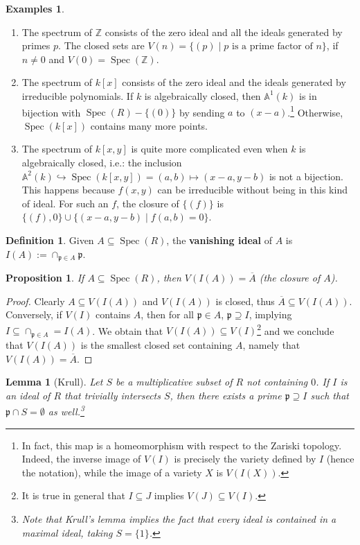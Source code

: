 \documentclass{tufte-handout} %
\newtheorem{prop}[thm]{Proposition}
\newtheorem{lem}[thm]{Lemma}
\theoremstyle{definition}
\newtheorem{defn}[thm]{Definition}
\newtheorem{exmps}[thm]{Examples}
\theoremstyle{remark}
\newcommand{\Z}{\mathbb{Z}}
\newcommand{\bA}{\mathbb{A}}
\newcommand{\lp}{{\mathfrak{p}}}
\DeclareMathOperator{\spec}{Spec}
\begin{document}
\begin{exmps}
	\begin{enumerate}
		\item The spectrum of $\Z$ consists of the zero ideal and all the ideals generated by primes $p$. The closed sets are $V(n) = \{(p) \mid p \text{ is a prime factor of } n\}$, if $n\neq 0$ and $V(0) = \spec(\Z)$.
		\item The spectrum of $k[x]$ consists of the zero ideal and the ideals generated by irreducible polynomials. If $k$ is algebraically closed, then $\bA^1(k)$ is in bijection with $\spec(R) - \{(0)\}$ by sending $a$ to $(x-a)$.\footnote{In fact, this map is a homeomorphism with respect to the Zariski topology. Indeed, the inverse image of $V(I)$ is precisely the variety defined by $I$ (hence the notation), while the image of a variety $X$ is $V(I(X))$.} Otherwise, $\spec(k[x])$ contains many more points.
		\item The spectrum of $k[x,y]$ is quite more complicated even when $k$ is algebraically closed, i.e.: the inclusion $\bA^2(k) \hookrightarrow \spec(k[x,y])= (a,b) \mapsto (x-a, y-b)$ is not a bijection. This happens because $f(x,y)$ can be irreducible without being in this kind of ideal. For such an $f$, the closure of $\{(f)\}$ is $\{(f), 0\} \cup \{(x-a,y-b) \mid f(a,b) = 0\}$.
	\end{enumerate}
\end{exmps}
\begin{defn}
	Given $A \subseteq \spec(R)$, the \textbf{vanishing ideal} of $A$ is $I(A) := \cap_{\lp \in A}\lp$.
\end{defn}
\begin{prop}
	If $A \subseteq \spec(R)$, then $V(I(A)) = \overline{A}$ (the closure of $A$).
\end{prop}
\begin{proof}
	Clearly $A \subseteq V(I(A))$ and $V(I(A))$ is closed, thus $\overline{A} \subseteq V(I(A))$. Conversely, if $V(I)$ contains $A$, then for all $\lp \in A$, $\lp \supseteq I$, implying $I \subseteq \cap_{\lp \in A} = I(A)$. We obtain that $V(I(A)) \subseteq V(I)$\footnote{It is true in general that $I \subseteq J$ implies $V(J) \subseteq V(I)$.} and we conclude that $V(I(A))$ is the smallest closed set containing $A$, namely that $V(I(A)) = \overline{A}$.
\end{proof}%
\begin{lem}[Krull]
	Let $S$ be a multiplicative subset of $R$ not containing $0$. If $I$ is an ideal of $R$ that trivially intersects $S$, then there exists a prime $\lp \supseteq I$ such that $\lp \cap S = \emptyset$ as well.\footnote{Note that Krull's lemma implies the fact that every ideal is contained in a maximal ideal, taking $S = \{1\}$.}
\end{lem}
\end{document}
